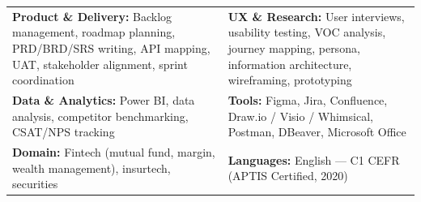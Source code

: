 \documentclass[a4paper,10pt]{article}
\begin{document}
\vspace{2pt}
\begin{tabularx}{\textwidth}{@{}X X@{}}
\textbf{Product \& Delivery:} {\small Backlog management, roadmap planning, PRD/BRD/SRS writing, API mapping, UAT, stakeholder alignment, sprint coordination} &
\textbf{UX \& Research:} {\small User interviews, usability testing, VOC analysis, journey mapping, persona, information architecture, wireframing, prototyping} \\[8pt]

\textbf{Data \& Analytics:} {\small Power BI, data analysis, competitor benchmarking, CSAT/NPS tracking} &
\textbf{Tools:} {\small Figma, Jira, Confluence, Draw.io / Visio / Whimsical, Postman, DBeaver, Microsoft Office} \\[8pt]

\textbf{Domain:} {\small Fintech (mutual fund, margin, wealth management), insurtech, securities} &
\textbf{Languages:} {\small English --- C1 CEFR (APTIS Certified, 2020)} \\
\end{tabularx}
\end{document}
